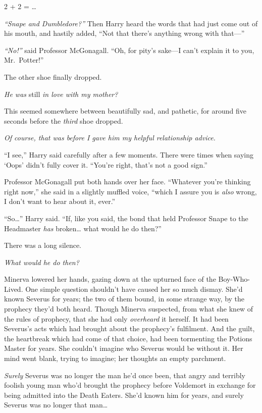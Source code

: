 2 + 2 = \ldots{}

\emph{``Snape and Dumbledore?''} Then Harry heard the words that had
just come out of his mouth, and hastily added, ``Not that there's
anything wrong with that---''

\emph{``No!''} said Professor McGonagall. ``Oh, for pity's sake---I
can't explain it to you, Mr.~Potter!''

The other shoe finally dropped.

\emph{He was} still \emph{in love with my mother?}

This seemed somewhere between beautifully sad, and pathetic, for around
five seconds before the \emph{third} shoe dropped.

\emph{Of course, that was before I gave him my helpful relationship
advice.}

``I see,'' Harry said carefully after a few moments. There were times
when saying `Oops' didn't fully cover it. ``You're right, that's not a
good sign.''

Professor McGonagall put both hands over her face. ``Whatever you're
thinking right now,'' she said in a slightly muffled voice, ``which I
assure you is \emph{also} wrong, I don't want to hear about it, ever.''

``So\ldots{}'' Harry said. ``If, like you said, the bond that held
Professor Snape to the Headmaster \emph{has} broken\ldots{} what would
he do then?''

There was a long silence.

\emph{What would he do then?}

Minerva lowered her hands, gazing down at the upturned face of the
Boy-Who-Lived. One simple question shouldn't have caused her so much
dismay. She'd known Severus for years; the two of them bound, in some
strange way, by the prophecy they'd both heard. Though Minerva
suspected, from what she knew of the rules of prophecy, that she had
only \emph{overheard} it herself. It had been Severus's acts which had
brought about the prophecy's fulfilment. And the guilt, the heartbreak
which had come of that choice, had been tormenting the Potions Master
for years. She couldn't imagine who Severus would be without it. Her
mind went blank, trying to imagine; her thoughts an empty parchment.

\emph{Surely} Severus was no longer the man he'd once been, that angry
and terribly foolish young man who'd brought the prophecy before
Voldemort in exchange for being admitted into the Death Eaters. She'd
known him for years, and surely Severus was no longer that man\ldots{}

